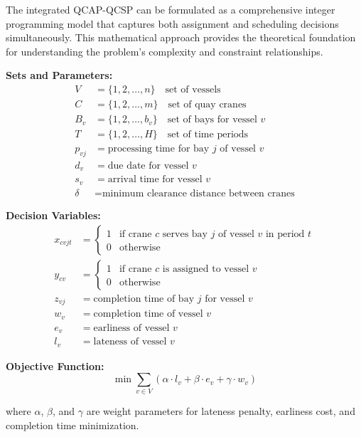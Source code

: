 \documentclass{article}
\begin{document}
The integrated QCAP-QCSP can be formulated as a comprehensive integer programming model that captures both assignment and scheduling decisions simultaneously. This mathematical approach provides the theoretical foundation for understanding the problem's complexity and constraint relationships.

\textbf{Sets and Parameters:}
\begin{align}
V &= \{1, 2, \ldots, n\} \quad \text{set of vessels} \\
C &= \{1, 2, \ldots, m\} \quad \text{set of quay cranes} \\
B_v &= \{1, 2, \ldots, b_v\} \quad \text{set of bays for vessel } v \\
T &= \{1, 2, \ldots, H\} \quad \text{set of time periods} \\
p_{vj} &= \text{processing time for bay } j \text{ of vessel } v \\
d_v &= \text{due date for vessel } v \\
s_v &= \text{arrival time for vessel } v \\
\delta &= \text{minimum clearance distance between cranes}
\end{align}

\textbf{Decision Variables:}
\begin{align}
x_{cvjt} &= \begin{cases} 
1 & \text{if crane } c \text{ serves bay } j \text{ of vessel } v \text{ in period } t \\
0 & \text{otherwise}
\end{cases} \\
y_{cv} &= \begin{cases}
1 & \text{if crane } c \text{ is assigned to vessel } v \\
0 & \text{otherwise}
\end{cases} \\
z_{vj} &= \text{completion time of bay } j \text{ for vessel } v \\
w_v &= \text{completion time of vessel } v \\
e_v &= \text{earliness of vessel } v \\
l_v &= \text{lateness of vessel } v
\end{align}

\textbf{Objective Function:}
\begin{equation}
\min \sum_{v \in V} (\alpha \cdot l_v + \beta \cdot e_v + \gamma \cdot w_v)
\end{equation}

where $\alpha$, $\beta$, and $\gamma$ are weight parameters for lateness penalty, earliness cost, and completion time minimization.
\end{document}
